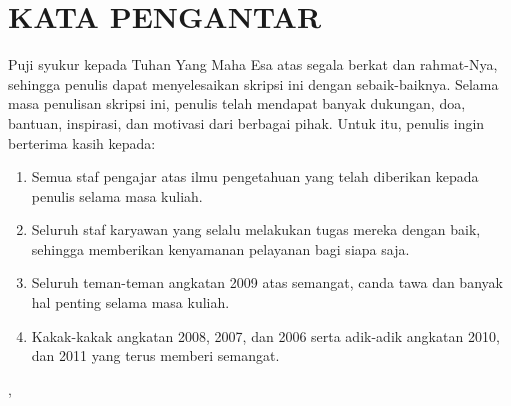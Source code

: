 \chapter*{\normalsize KATA PENGANTAR}

Puji syukur kepada Tuhan Yang Maha Esa atas segala berkat dan rahmat-Nya, sehingga penulis dapat menyelesaikan skripsi ini dengan sebaik-baiknya. Selama masa penulisan skripsi ini, penulis telah mendapat banyak dukungan, doa, bantuan, inspirasi, dan motivasi dari berbagai pihak. Untuk itu, penulis ingin berterima kasih kepada:
\begin{enumerate}
	\item Semua staf pengajar atas ilmu pengetahuan yang telah diberikan kepada penulis selama masa kuliah.
	\item Seluruh staf karyawan yang selalu melakukan tugas mereka dengan baik, sehingga memberikan kenyamanan pelayanan bagi siapa saja.
	\item Seluruh teman-teman angkatan 2009 atas semangat, canda tawa dan banyak hal penting selama masa kuliah.
	\item Kakak-kakak angkatan 2008, 2007, dan 2006 serta adik-adik angkatan 2010, dan 2011 yang terus memberi semangat.
\end{enumerate}

\lipsum[2-5]

\vspace*{0.5cm}

\begin{flushleft}
\kota, \tanggalPengesahan\\ %
\penulis %
\end{flushleft} 